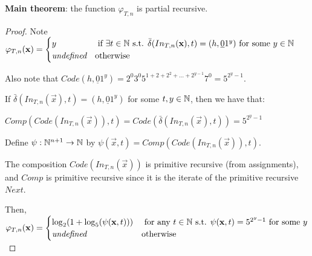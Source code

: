 \textbf{Main theorem}: the function $ \varphi_{T, n} $ is partial recursive.

\begin{proof}
	Note $ \varphi_{T, n}(\mathbf{x}) = \begin{cases}
	y &\text{ if } \exists t \in \mathbb{N} \text{ s.t. } \bar{\delta}(In_{T, n}(\mathbf{x}), t) = (h, \underline{0} 1^y) \text{ for some } y \in \mathbb{N}\\
	\textit{undefined} &\text{otherwise}
	\end{cases} $
	
	Also note that $ Code(h, \underline{0} 1^y) = 2^0 3^0 5^{1 + 2 + 2^2 + \dots + 2^{y - 1}} 7^0 = 5^{2^y - 1}$.
	
	If $ \bar{\delta}(In_{T, n}(\vec{x}), t) = (h, \underline{0} 1^y) $ for some $ t, y \in \mathbb{N} $, then we have that:
	
	$ Comp(Code(In_{T, n}(\vec{x})), t) = Code(\bar{\delta}(In_{T, n}(\vec{x}), t)) = 5^{2^y - 1} $
	
	Define $ \psi: \mathbb{N}^{n+1} \to \mathbb{N} $ by $ \psi(\vec{x}, t) = Comp(Code(In_{T, n}(\vec{x})), t) $.
	
	The composition $ Code(In_{T, n}(\vec{x})) $ is primitive recursive (from assignments), and $ Comp $ is primitive recursive since it is the iterate of the primitive recursive $ Next $.
	
	Then, $ \varphi_{T, n}(\mathbf{x}) = \begin{cases}
	\log_2 (1 + \log_5(\psi(\mathbf{x}, t))) &\text{ for any } t \in \mathbb{N} \text{ s.t. } \psi(\mathbf{x}, t) = 5^{2^y - 1} \text{ for some } y\\
	\textit{undefined} &\text{otherwise}
	\end{cases} $

\end{proof}